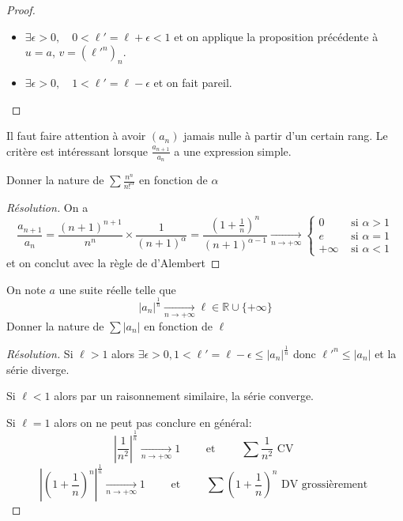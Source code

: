 \begin{proof}~
    \begin{itemize}
        \item $\exists \epsilon>0, \quad 0<\ell'=\ell+\epsilon<1$ et on applique la proposition précédente à $u=a$, $v=(\ell'^n)_n$.
        \item $\exists \epsilon > 0, \quad 1<\ell'=\ell-\epsilon$ et on fait pareil.
    \end{itemize}
\end{proof}

\begin{rem}
    Il faut faire attention à avoir $(a_n)$ jamais nulle à partir d'un certain rang. Le critère est intéressant lorsque $\frac{a_{n+1}}{a_n}$ a une expression simple.
\end{rem}

\begin{exo}
    Donner la nature de $\sum\frac{n^n}{n!^\alpha}$ en fonction de $\alpha$
\end{exo}

\begin{proof}[Résolution]
    On a \[
        \frac{a_{n+1}}{a_n}=\frac{(n+1)^{n+1}}{n^n}\times \frac1{(n+1)^\alpha}=\frac{ \left( 1+\frac1n \right)^n }{(n+1)^{\alpha-1}}\xrightarrow[n\to+\infty]{} \begin{cases}
            0&\text{ si }\alpha>1 \\ e &\text{ si }\alpha=1\\ +\infty& \text{ si }\alpha<1
        \end{cases}
    \]
    et on conclut avec la règle de d'Alembert
\end{proof}

\begin{exo}
    On note $a$ une suite réelle telle que \[
        |a_n|^{\frac1n}\xrightarrow[n\to+\infty]{}\ell\in\mathbb R\cup\{+\infty\}
    \]
    Donner la nature de $\sum |a_n|$ en fonction de $\ell$
\end{exo}

\begin{proof}[Résolution]
    Si $\ell>1$ alors $\exists \epsilon>0, 1<\ell'=\ell-\epsilon\leq |a_n|^{\frac1n}$ donc $\ell'^n\leq |a_n|$ et la série diverge.

    Si $\ell<1$ alors par un raisonnement similaire, la série converge.

    Si $\ell=1$ alors on ne peut pas conclure en général: \[
        \left| \frac1{n^2} \right|^{\frac1n}\xrightarrow[n\to+\infty]{}1\qquad\text{ et }\qquad \sum\frac1{n^2}\text{ CV }
    \]
    \[
        \left| \left( 1+\frac1n\right)^n \right|^{\frac1n}\xrightarrow[n\to+\infty]{}1\qquad \text{ et }\qquad \sum \left( 1+\frac1n \right)^{n}\text{ DV grossièrement }
    \]
\end{proof}

